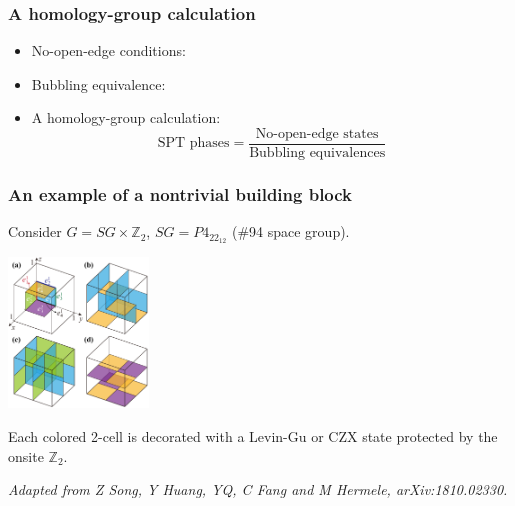 \documentclass[xcolor=table, 11pt, aspectratio=43]{beamer}
\newcommand{\uone}{\mathrm U(1)}
\begin{document}
\begin{frame}
\frametitle{A homology-group calculation}
\begin{itemize}
\item No-open-edge conditions:
\item Bubbling equivalence:
\item A homology-group calculation:
\[\text{SPT phases} = \frac{\text{No-open-edge states}}
{\text{Bubbling equivalences}}\]
\end{itemize}
\end{frame}






\begin{frame}
\frametitle{An example of a nontrivial building block}
Consider $G=SG\times\mathbb Z_2$, $SG=P4_22_12$ (\#94 space group).
\begin{center}
\includegraphics[height=4cm]{blocks}
\end{center}
Each colored 2-cell is decorated with a Levin-Gu or CZX state protected by the onsite $\mathbb Z_2$.

\emph{\small Adapted from Z Song, Y Huang, YQ, C Fang and M Hermele, arXiv:1810.02330.}
\end{frame}
\end{document}
